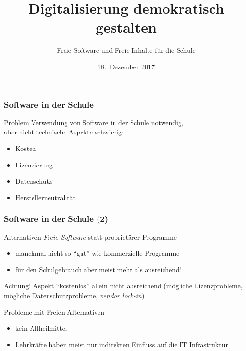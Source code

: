 \documentclass{beamer}
\date{18.~Dezember 2017}
\begin{document}
\title{Digitalisierung demokratisch gestalten}
\subtitle{Freie Software und Freie Inhalte für die Schule}

\maketitle

\begin{frame}
  \frametitle{Software in der Schule}

  \onslide<+->

  \begin{block}{Problem}
    Verwendung von Software in der Schule notwendig, \\
    aber nicht-technische Aspekte schwierig:
    \begin{itemize}
    \item Kosten
    \item Lizenzierung
    \item Datenschutz
    \item Herstellerneutralität
    \end{itemize}
  \end{block}
\end{frame}

\begin{frame}
  \frametitle{Software in der Schule (2)}

  \onslide<+->

  \begin{block}{Alternativen}
    \emph{Freie Software} statt proprietärer Programme
    \begin{itemize}
    \item manchmal nicht so \enquote{gut} wie kommerzielle Programme
    \item für den Schulgebrauch aber meist mehr als ausreichend!
    \end{itemize}
  \end{block}

  \onslide<+->

  \begin{block}{Achtung!}
    Aspekt \enquote{kostenlos} allein nicht ausreichend (mögliche
    Lizenzprobleme, mögliche Datenschutzprobleme, \emph{vendor
      lock-in})
  \end{block}

  \begin{block}{Probleme mit Freien Alternativen}
    \begin{itemize}
    \item kein Allheilmittel
    \item Lehrkräfte haben meist nur indirekten Einfluss auf die IT
      Infrastruktur
    \end{itemize}
  \end{block}
\end{frame}
\end{document}
